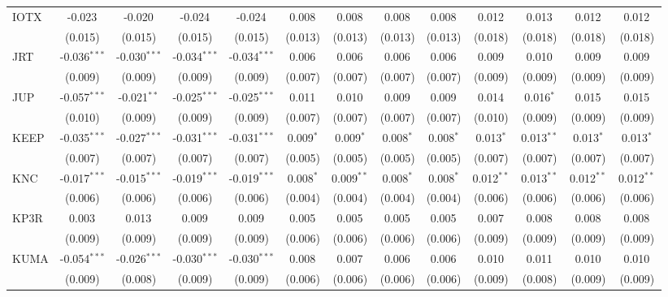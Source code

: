 \begin{table}[!htbp]
\begin{tabular}{@{\extracolsep{5pt}}lcccccccccccc}
 IOTX & -0.023$^{}$ & -0.020$^{}$ & -0.024$^{}$ & -0.024$^{}$ & 0.008$^{}$ & 0.008$^{}$ & 0.008$^{}$ & 0.008$^{}$ & 0.012$^{}$ & 0.013$^{}$ & 0.012$^{}$ & 0.012$^{}$ \\
  & (0.015) & (0.015) & (0.015) & (0.015) & (0.013) & (0.013) & (0.013) & (0.013) & (0.018) & (0.018) & (0.018) & (0.018) \\
 JRT & -0.036$^{***}$ & -0.030$^{***}$ & -0.034$^{***}$ & -0.034$^{***}$ & 0.006$^{}$ & 0.006$^{}$ & 0.006$^{}$ & 0.006$^{}$ & 0.009$^{}$ & 0.010$^{}$ & 0.009$^{}$ & 0.009$^{}$ \\
  & (0.009) & (0.009) & (0.009) & (0.009) & (0.007) & (0.007) & (0.007) & (0.007) & (0.009) & (0.009) & (0.009) & (0.009) \\
 JUP & -0.057$^{***}$ & -0.021$^{**}$ & -0.025$^{***}$ & -0.025$^{***}$ & 0.011$^{}$ & 0.010$^{}$ & 0.009$^{}$ & 0.009$^{}$ & 0.014$^{}$ & 0.016$^{*}$ & 0.015$^{}$ & 0.015$^{}$ \\
  & (0.010) & (0.009) & (0.009) & (0.009) & (0.007) & (0.007) & (0.007) & (0.007) & (0.010) & (0.009) & (0.009) & (0.009) \\
 KEEP & -0.035$^{***}$ & -0.027$^{***}$ & -0.031$^{***}$ & -0.031$^{***}$ & 0.009$^{*}$ & 0.009$^{*}$ & 0.008$^{*}$ & 0.008$^{*}$ & 0.013$^{*}$ & 0.013$^{**}$ & 0.013$^{*}$ & 0.013$^{*}$ \\
  & (0.007) & (0.007) & (0.007) & (0.007) & (0.005) & (0.005) & (0.005) & (0.005) & (0.007) & (0.007) & (0.007) & (0.007) \\
 KNC & -0.017$^{***}$ & -0.015$^{***}$ & -0.019$^{***}$ & -0.019$^{***}$ & 0.008$^{*}$ & 0.009$^{**}$ & 0.008$^{*}$ & 0.008$^{*}$ & 0.012$^{**}$ & 0.013$^{**}$ & 0.012$^{**}$ & 0.012$^{**}$ \\
  & (0.006) & (0.006) & (0.006) & (0.006) & (0.004) & (0.004) & (0.004) & (0.004) & (0.006) & (0.006) & (0.006) & (0.006) \\
 KP3R & 0.003$^{}$ & 0.013$^{}$ & 0.009$^{}$ & 0.009$^{}$ & 0.005$^{}$ & 0.005$^{}$ & 0.005$^{}$ & 0.005$^{}$ & 0.007$^{}$ & 0.008$^{}$ & 0.008$^{}$ & 0.008$^{}$ \\
  & (0.009) & (0.009) & (0.009) & (0.009) & (0.006) & (0.006) & (0.006) & (0.006) & (0.009) & (0.009) & (0.009) & (0.009) \\
 KUMA & -0.054$^{***}$ & -0.026$^{***}$ & -0.030$^{***}$ & -0.030$^{***}$ & 0.008$^{}$ & 0.007$^{}$ & 0.006$^{}$ & 0.006$^{}$ & 0.010$^{}$ & 0.011$^{}$ & 0.010$^{}$ & 0.010$^{}$ \\
  & (0.009) & (0.008) & (0.009) & (0.009) & (0.006) & (0.006) & (0.006) & (0.006) & (0.009) & (0.008) & (0.009) & (0.009) \\

\end{tabular}
\end{table}
